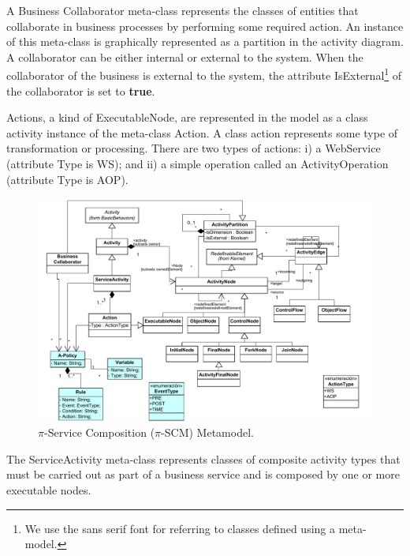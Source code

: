 \begin{itemizedTrivlist}
\item A {\sc Business Collaborator} meta-class represents the classes of entities that collaborate in  business processes by performing some  required action. 
An instance of this meta-class is graphically represented as a partition in the activity diagram. 
A collaborator can be either internal or external to the system. 
When the collaborator of the business is external to the system, the attribute {\sf IsExternal}\footnote{We use the {\sf sans serif} font for referring to classes defined using a meta-model.} of the collaborator is set to \textbf{true}.

\item {\sc Action}s, a kind of {\sc ExecutableNode}, are represented in the model as a class activity instance of the meta-class Action. 
A class action represents some type of transformation or processing. 
There are two types of actions: i) a WebService (attribute Type is {\sf WS}); and ii) a simple operation called an {\sc ActivityOperation} (attribute Type is {\sc AOP}).
\begin{figure}[t]
\centering
\includegraphics[width=1.0\textwidth]{figs/E-service-composition-metamodel}
\caption{$\pi$-Service Composition ($\pi$-SCM) Metamodel.}
\label{fig:e-scomposition-metamodel}
\end{figure}

\item The {\sc ServiceActivity} meta-class represents classes of composite activity types that must be carried out as part of a business service and is composed by one or more executable nodes.


\end{itemizedTrivlist}
